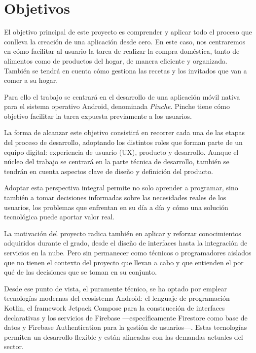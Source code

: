\cleardoublepage %
\chapter{Objetivos} %
\label{chap:objetivos} %

El objetivo principal de este proyecto es comprender y aplicar todo el proceso que conlleva la creación de una aplicación desde cero. En este caso, nos centraremos en cómo facilitar al usuario la tarea de realizar la compra doméstica, tanto de alimentos como de productos del hogar, de manera eficiente y organizada. También se tendrá en cuenta cómo gestiona las recetas y los invitados que van a comer a su hogar.

Para ello el trabajo se centrará en el desarrollo de una aplicación móvil nativa para el sistema operativo Android, denominada \textit{Pinche}. Pinche tiene cómo objetivo facilitar la tarea expuesta previamente a los usuarios.

La forma de alcanzar este objetivo consistirá en recorrer cada una de las etapas del proceso de desarrollo, adoptando los distintos roles que forman parte de un equipo digital: experiencia de usuario (UX), producto y desarrollo. Aunque el núcleo del trabajo se centrará en la parte técnica de desarrollo, también se tendrán en cuenta aspectos clave de diseño y definición del producto.

Adoptar esta perspectiva integral permite no solo aprender a programar, sino también a tomar decisiones informadas sobre las necesidades reales de los usuarios, los problemas que enfrentan en su día a día y cómo una solución tecnológica puede aportar valor real.

La motivación del proyecto radica también  en aplicar y reforzar conocimientos adquiridos durante el grado, desde el diseño de interfaces hasta la integración de servicios en la nube. Pero sin permanecer como técnicos o programadores aislados que no tienen el contexto del proyecto que llevan a cabo y que entienden el por qué de las decisiones que se toman en su conjunto.

Desde ese punto de vista, el puramente técnico, se ha optado por emplear tecnologías modernas del ecosistema Android: el lenguaje de programación Kotlin, el framework Jetpack Compose para la construcción de interfaces declarativas y los servicios de Firebase —específicamente Firestore como base de datos y Firebase Authentication para la gestión de usuarios—. Estas tecnologías permiten un desarrollo flexible y están alineadas con las demandas actuales del sector.

